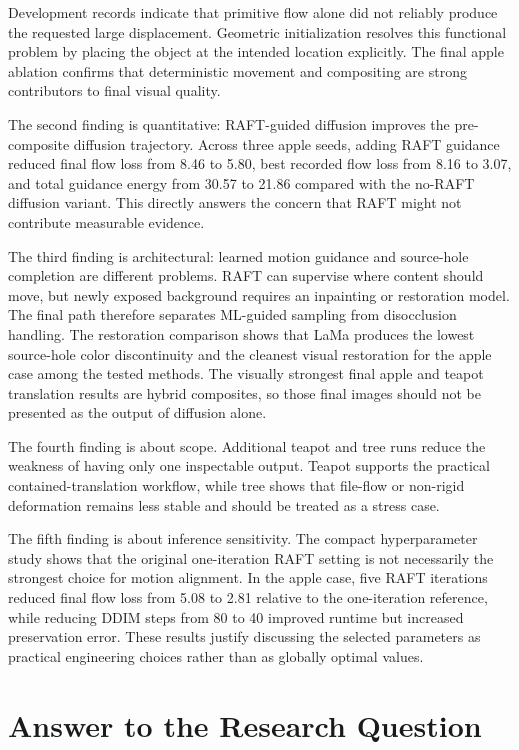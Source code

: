 Development records indicate that primitive flow alone did not reliably produce the requested large displacement. Geometric initialization resolves this functional problem by placing the object at the intended location explicitly. The final apple ablation confirms that deterministic movement and compositing are strong contributors to final visual quality.

The second finding is quantitative: RAFT-guided diffusion improves the pre-composite diffusion trajectory. Across three apple seeds, adding RAFT guidance reduced final flow loss from 8.46 to 5.80, best recorded flow loss from 8.16 to 3.07, and total guidance energy from 30.57 to 21.86 compared with the no-RAFT diffusion variant. This directly answers the concern that RAFT might not contribute measurable evidence.

The third finding is architectural: learned motion guidance and source-hole completion are different problems. RAFT can supervise where content should move, but newly exposed background requires an inpainting or restoration model. The final path therefore separates ML-guided sampling from disocclusion handling. The restoration comparison shows that LaMa produces the lowest source-hole color discontinuity and the cleanest visual restoration for the apple case among the tested methods. The visually strongest final apple and teapot translation results are hybrid composites, so those final images should not be presented as the output of diffusion alone.

The fourth finding is about scope. Additional teapot and tree runs reduce the weakness of having only one inspectable output. Teapot supports the practical contained-translation workflow, while tree shows that file-flow or non-rigid deformation remains less stable and should be treated as a stress case.

The fifth finding is about inference sensitivity. The compact hyperparameter study shows that the original one-iteration RAFT setting is not necessarily the strongest choice for motion alignment. In the apple case, five RAFT iterations reduced final flow loss from 5.08 to 2.81 relative to the one-iteration reference, while reducing DDIM steps from 80 to 40 improved runtime but increased preservation error. These results justify discussing the selected parameters as practical engineering choices rather than as globally optimal values.

\section{Answer to the Research Question}

